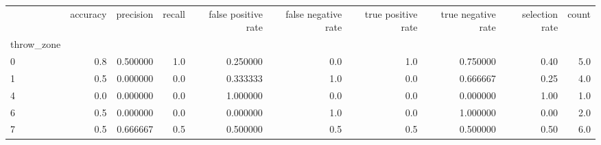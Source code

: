 \begin{tabular}{lrrrrrrrrr}
\toprule
{} &  accuracy &  precision &  recall &  false positive rate &  false negative rate &  true positive rate &  true negative rate &  selection rate &  count \\
throw\_zone &           &            &         &                      &                      &                     &                     &                 &        \\
\midrule
0          &       0.8 &   0.500000 &     1.0 &             0.250000 &                  0.0 &                 1.0 &            0.750000 &            0.40 &    5.0 \\
1          &       0.5 &   0.000000 &     0.0 &             0.333333 &                  1.0 &                 0.0 &            0.666667 &            0.25 &    4.0 \\
4          &       0.0 &   0.000000 &     0.0 &             1.000000 &                  0.0 &                 0.0 &            0.000000 &            1.00 &    1.0 \\
6          &       0.5 &   0.000000 &     0.0 &             0.000000 &                  1.0 &                 0.0 &            1.000000 &            0.00 &    2.0 \\
7          &       0.5 &   0.666667 &     0.5 &             0.500000 &                  0.5 &                 0.5 &            0.500000 &            0.50 &    6.0 \\
\bottomrule
\end{tabular}
